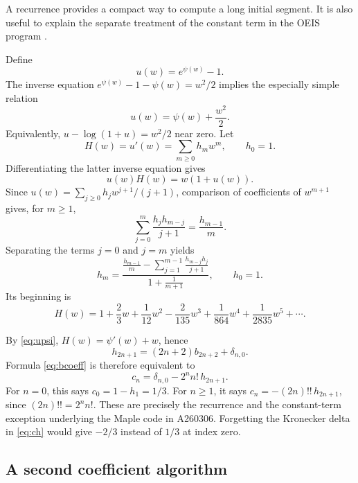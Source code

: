 \documentclass[11pt,letterpaper]{article}
\numberwithin{equation}{section}
\theoremstyle{remark}
\begin{document}
A recurrence provides a compact way to compute a long initial segment.
It is also useful to explain the separate treatment of the constant term
in the OEIS program \cite{oeis260306}.

Define
\begin{equation}
 u(w)=e^{\psi(w)}-1.
 \label{eq:u}
\end{equation}
The inverse equation $e^{\psi(w)}-1-\psi(w)=w^2/2$ implies the especially
simple relation
\begin{equation}
 u(w)=\psi(w)+\frac{w^2}{2}.
 \label{eq:upsi}
\end{equation}
Equivalently, $u-\log(1+u)=w^2/2$ near zero. Let
\begin{equation}
 H(w)=u'(w)=\sum_{m\geq0}h_mw^m,\qquad h_0=1.
 \label{eq:H}
\end{equation}
Differentiating the latter inverse equation gives
\begin{equation}
 u(w)H(w)=w(1+u(w)).
 \label{eq:quadratic}
\end{equation}
Since $u(w)=\sum_{j\geq0}h_jw^{j+1}/(j+1)$, comparison of coefficients of
$w^{m+1}$ gives, for $m\geq1$,
\[
 \sum_{j=0}^{m}\frac{h_jh_{m-j}}{j+1}=\frac{h_{m-1}}m.
\]
Separating the terms $j=0$ and $j=m$ yields
\begin{equation}
 \boxed{\displaystyle
 h_m=\frac{\displaystyle\frac{h_{m-1}}m
          -\sum_{j=1}^{m-1}\frac{h_{m-j}h_j}{j+1}}
         {\displaystyle1+\frac1{m+1}},\qquad h_0=1.}
 \label{eq:hrec}
\end{equation}
Its beginning is
\[
 H(w)=1+\frac23w+\frac1{12}w^2-\frac2{135}w^3
          +\frac1{864}w^4+\frac1{2835}w^5+\cdots.
\]

By \eqref{eq:upsi}, $H(w)=\psi'(w)+w$, hence
\[
 h_{2n+1}=(2n+2)b_{2n+2}+\delta_{n,0}.
\]
Formula \eqref{eq:bcoeff} is therefore equivalent to
\begin{equation}
 \boxed{\displaystyle
 c_n=\delta_{n,0}-2^n n!\,h_{2n+1}.}
 \label{eq:ch}
\end{equation}
For $n=0$, this says $c_0=1-h_1=1/3$. For $n\geq1$, it says
$c_n=-(2n)!!\,h_{2n+1}$, since $(2n)!!=2^nn!$.
These are precisely the recurrence and the constant-term exception
underlying the Maple code in A260306. Forgetting the Kronecker delta in
\eqref{eq:ch} would give $-2/3$ instead of $1/3$ at index zero.

\subsection{A second coefficient algorithm}
\end{document}
